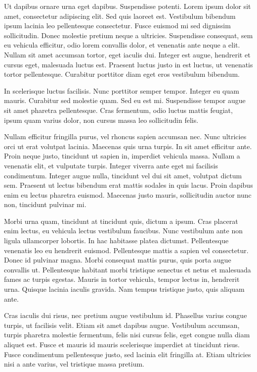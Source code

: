 \documentclass{homework}
\begin{document}
Ut dapibus ornare urna eget dapibus. Suspendisse potenti. Lorem ipsum dolor sit amet, consectetur adipiscing elit. Sed quis laoreet est. Vestibulum bibendum ipsum lacinia leo pellentesque consectetur. Fusce euismod mi sed dignissim sollicitudin. Donec molestie pretium neque a ultricies. Suspendisse consequat, sem eu vehicula efficitur, odio lorem convallis dolor, et venenatis ante neque a elit. Nullam sit amet accumsan tortor, eget iaculis dui. Integer est augue, hendrerit et cursus eget, malesuada luctus est. Praesent luctus justo in est luctus, ut venenatis tortor pellentesque. Curabitur porttitor diam eget eros vestibulum bibendum.

In scelerisque luctus facilisis. Nunc porttitor semper tempor. Integer eu quam mauris. Curabitur sed molestie quam. Sed eu est mi. Suspendisse tempor augue sit amet pharetra pellentesque. Cras fermentum, odio luctus mattis feugiat, ipsum quam varius dolor, non cursus massa leo sollicitudin felis.

Nullam efficitur fringilla purus, vel rhoncus sapien accumsan nec. Nunc ultricies orci ut erat volutpat lacinia. Maecenas quis urna turpis. In sit amet efficitur ante. Proin neque justo, tincidunt ut sapien in, imperdiet vehicula massa. Nullam a venenatis elit, et vulputate turpis. Integer viverra ante eget mi facilisis condimentum. Integer augue nulla, tincidunt vel dui sit amet, volutpat dictum sem. Praesent ut lectus bibendum erat mattis sodales in quis lacus. Proin dapibus enim eu lectus pharetra euismod. Maecenas justo mauris, sollicitudin auctor nunc non, tincidunt pulvinar mi.

Morbi urna quam, tincidunt at tincidunt quis, dictum a ipsum. Cras placerat enim lectus, eu vehicula lectus vestibulum faucibus. Nunc vestibulum ante non ligula ullamcorper lobortis. In hac habitasse platea dictumst. Pellentesque venenatis leo eu hendrerit euismod. Pellentesque mattis a sapien vel consectetur. Donec id pulvinar magna. Morbi consequat mattis purus, quis porta augue convallis ut. Pellentesque habitant morbi tristique senectus et netus et malesuada fames ac turpis egestas. Mauris in tortor vehicula, tempor lectus in, hendrerit urna. Quisque lacinia iaculis gravida. Nam tempus tristique justo, quis aliquam ante.

Cras iaculis dui risus, nec pretium augue vestibulum id. Phasellus varius congue turpis, ut facilisis velit. Etiam sit amet dapibus augue. Vestibulum accumsan, turpis pharetra molestie fermentum, felis nisi cursus felis, eget congue nulla diam aliquet est. Fusce et mauris id mauris scelerisque imperdiet at tincidunt risus. Fusce condimentum pellentesque justo, sed lacinia elit fringilla at. Etiam ultricies nisi a ante varius, vel tristique massa pretium.
\end{document}

